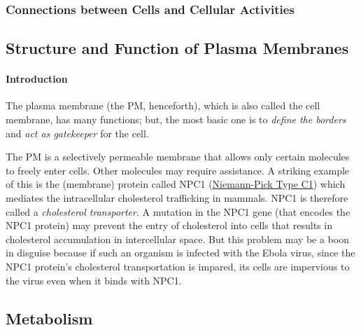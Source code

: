 \subsubsection{Connections between Cells and Cellular Activities}


\subsection{Structure and Function of Plasma Membranes}
\paragraph{Introduction}
The plasma membrane (the PM, henceforth), which is also called the cell membrane, has many functions; but, the most basic one is to \emph{define the borders} and \emph{act as gatekeeper} for the cell.

The PM is a selectively permeable membrane that allows only certain molecules to freely enter cells. Other molecules may require assistance. A striking example of this is the (membrane) protein called NPC1 (\href{https://en.wikipedia.org/wiki/NPC1}{Niemann-Pick Type C1}) which mediates the intracellular cholesterol trafficking in mammals. NPC1 is therefore called a \emph{cholesterol transporter}. A mutation in the NPC1 gene (that encodes the NPC1 protein) may prevent the entry of cholesterol into cells that results in cholesterol accumulation in intercellular space. But this problem may be a boon in disguise because if such an organism is infected with the Ebola virus, since the NPC1 protein's cholesterol transportation is impared, its cells are impervious to the virus even when it binds with NPC1.

\subsection{Metabolism}
